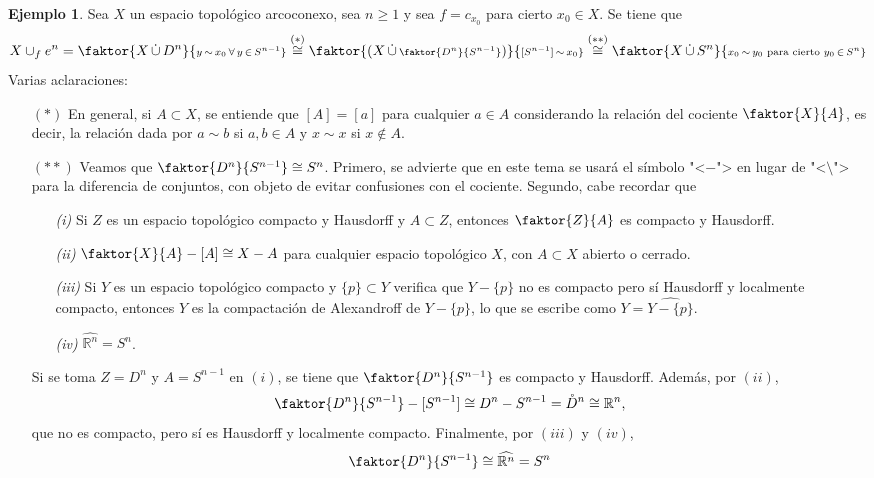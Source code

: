\documentclass[11pt]{report}
\theoremstyle{definition}
\theoremstyle{definition}
\newtheorem{example}{Ejemplo}[chapter]
\theoremstyle{remark}
\newcommand{\R}{\mathbb R}
\begin{document}
\begin{example}
Sea $X$ un espacio topológico arcoconexo, sea $n \geq 1$ y sea $f = c_{x_0}$ para cierto $x_0 \in X$. Se tiene que
\[X \cup_f e^n = \faktor{X \, \dot\cup \, D^n}{\scriptstyle{y \, \sim \, x_0 \, \forall \, y \,\in\, S^{n-1}}} \overset{(*)}{\cong} \faktor{(X \, \dot\cup \, \scriptstyle{\faktor{D^n}{S^{n-1}}} \displaystyle)}{\scriptstyle{[S^{n-1}] \,\sim\, x_0}} \overset{(**)}{\cong} \faktor{X \, \dot\cup \, S^n}{\scriptstyle{x_0\, \sim\, y_0 \textup{ para cierto } y_0 \,\in\, S^n}}\]
Varias aclaraciones:
\begin{itemize}
    \item[$(*)$] En general, si $A \subset X$, se entiende que $[A] = [a]$ para cualquier $a \in A$ considerando la relación del cociente $\faktor{X}{A}$, es decir, la relación dada por $a \sim b$ si $a,b \in A$ y $x \sim x$ si $x \not\in A$.
    \item[$(**)$] Veamos que $\faktor{D^n}{S^{n-1}} \cong S^n$. Primero, se advierte que en este tema se usará el símbolo "<$-$"> en lugar de "<$\setminus$"> para la diferencia de conjuntos, con objeto de evitar confusiones con el cociente. Segundo, cabe recordar que
    \begin{itemize}
        \item[\textit{(i)}] Si $Z$ es un espacio topológico compacto y Hausdorff y $A \subset Z$, entonces $\faktor{Z}{A}$ es compacto y Hausdorff.
        \item[\textit{(ii)}] $\faktor{X}{A}-[A] \cong X-A$ para cualquier espacio topológico $X$, con  $A \subset X$ abierto o cerrado.
        \item[\textit{(iii)}] Si $Y$ es un espacio topológico compacto y $\{p\} \subset Y$ verifica que $Y - \{p\}$ no es compacto pero sí Hausdorff y localmente compacto, entonces $Y$ es la compactación de Alexandroff de $Y - \{p\}$, lo que se escribe como $ Y = \widehat{Y - \{p\}}$.
        \item[\textit{(iv)}] $\widehat{\R^n} = S^n$.
    \end{itemize}
    Si se toma $Z = D^n$ y $A = S^{n-1}$ en $(i)$, se tiene que $\faktor{D^n}{S^{n-1}}$ es compacto y Hausdorff. Además, por $(ii)$,
    \[\faktor{D^n}{S^{n-1}} - [S^{n-1}] \cong D^n - S^{n-1} = \mathring{D}^n \cong \R^n,\]
    que no es compacto, pero sí es Hausdorff y localmente compacto. Finalmente, por $(iii)$ y $(iv)$,
    \[\faktor{D^n}{S^{n-1}} \cong \widehat{\R^n} = S^n\]
\end{itemize}
\end{example}
\end{document}

